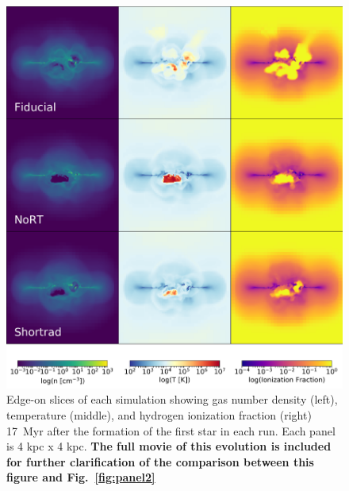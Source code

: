 \documentclass[twocolumn]{aastex62}
\begin{document}
\begin{figure}
\centering
\includegraphics[width=0.99\linewidth]{DD0136_fiducial_shortrad_nort}
\caption{Edge-on slices of each simulation showing gas number density (left), temperature (middle), and hydrogen ionization fraction (right) 17~Myr after the formation of the first star in each run. Each panel is 4 kpc x 4 kpc. \textbf{The full movie of this evolution is included for further clarification of the comparison between this figure and Fig.~\ref{fig:panel2}}}
\label{fig:panel1}
\end{figure}
\end{document}
